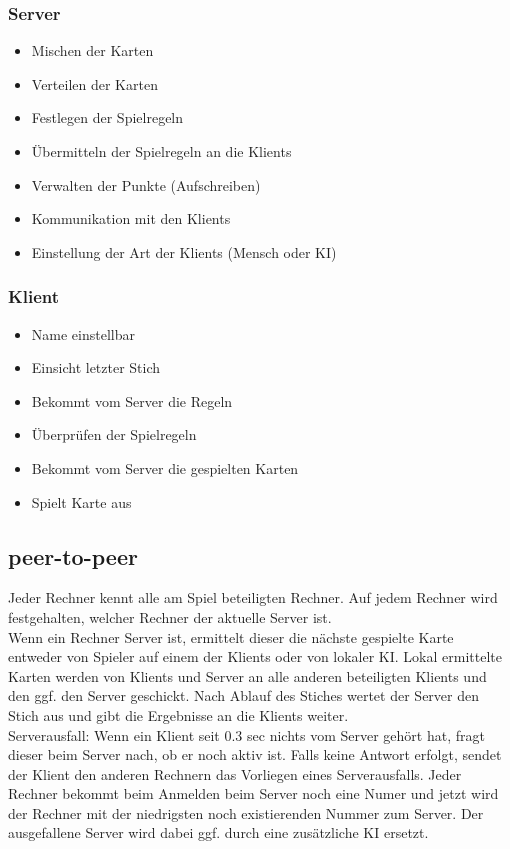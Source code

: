 \documentclass[12pt,a4paper]{article}
\begin{document}
\subsubsection{Server}
\begin{itemize}
\item Mischen der Karten
\item Verteilen der Karten
\item Festlegen der Spielregeln
\item Übermitteln der Spielregeln an die Klients
\item Verwalten der Punkte (Aufschreiben)
\item Kommunikation mit den Klients
\item Einstellung der Art der Klients (Mensch oder KI)
\end{itemize}
\subsubsection{Klient}
\begin{itemize}
\item Name einstellbar
\item Einsicht letzter Stich
\item Bekommt vom Server die Regeln
\item Überprüfen der Spielregeln
\item Bekommt vom Server die gespielten Karten
\item Spielt Karte aus
\end{itemize}
\subsection{peer-to-peer}
Jeder Rechner kennt alle am Spiel beteiligten Rechner.
Auf jedem Rechner wird festgehalten, welcher Rechner der aktuelle Server ist.\\
Wenn ein Rechner Server ist, ermittelt dieser die nächste gespielte Karte entweder von Spieler auf einem der Klients
oder von lokaler KI.
Lokal ermittelte Karten werden von Klients und Server an alle anderen beteiligten Klients und den ggf. den Server geschickt.
Nach Ablauf des Stiches wertet der Server den Stich aus und gibt die Ergebnisse an die Klients weiter.\\
Serverausfall: Wenn ein Klient seit 0.3 sec nichts vom Server gehört hat, fragt dieser beim Server nach, ob er noch aktiv ist.
Falls keine Antwort erfolgt, sendet der Klient den anderen Rechnern das Vorliegen eines Serverausfalls.
Jeder Rechner bekommt beim Anmelden beim Server noch eine Numer und jetzt wird der Rechner mit der niedrigsten noch existierenden
Nummer zum Server. Der ausgefallene Server wird dabei ggf. durch eine zusätzliche KI ersetzt.
\newpage
\end{document}
